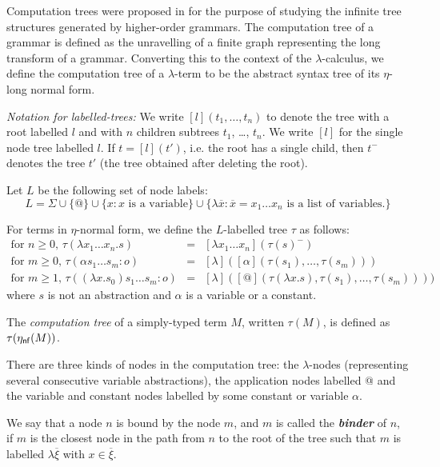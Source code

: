 \documentclass{llncs}
\newcommand\defname[1]{{\bf\em #1}\index{#1}}
\newcommand\etanf[1]{\eta_{\sf nf}(#1)}
\newcommand\union{\cup}
\begin{document}
Computation trees were proposed in \cite{OngHoMchecking2006} for the purpose of studying the infinite tree structures
generated by higher-order grammars. The computation tree of a grammar is defined as the unravelling of a finite graph representing the long transform of a grammar. Converting this to the context of the $\lambda$-calculus, we define the computation tree of a $\lambda$-term to be the abstract syntax tree of its $\eta$-long normal form.

\emph{Notation for labelled-trees:} We write $[l](t_1, \ldots, t_n)$ to denote the tree with a root labelled $l$ and with $n$ children subtrees $t_1$, \ldots, $t_n$. We write $[l]$ for the single node tree labelled $l$. If $t = [l](t')$, i.e. the root has a single child, then $t^-$ denotes the tree $t'$ (the tree obtained after deleting the root).

\begin{definition}
Let $L$ be the following set of node labels:
$$ L = \Sigma \union \{ @ \} \union \{ x : x \mbox { is a variable} \}
\union \{ \lambda \overline{x} : \overline{x} = x_1 \ldots x_n \mbox { is a list of variables.} \}
  $$

For terms in $\eta$-normal form, we define the $L$-labelled tree $\tau$ as follows:
\begin{eqnarray*}
  \mbox{for $n\geq0$, } \tau(\lambda x_1 \ldots x_n . s) &=& [\lambda x_1 \ldots x_n](\tau(s)^{-}) \\
  \mbox{for $m\geq0$, } \tau( \alpha s_1 \ldots s_m : o) &=& [ \lambda ]([\alpha](\tau(s_1),\ldots,\tau(s_m)))\\
  \mbox{for $m \geq 1$, } \tau((\lambda x.s_0) s_1 \ldots s_m :o) &=& [\lambda] ([@](\tau(\lambda x.s),\tau(s_1),\ldots,\tau(s_m))) )
\end{eqnarray*}
where $s$ is not an abstraction and $\alpha$ is a variable or a constant.

The \emph{computation tree} of a simply-typed term $M$, written $\tau(M)$, is defined as $\tau(\etanf{M})$.
\end{definition}

There are three kinds of nodes in the computation tree:
the $\lambda$-nodes (representing several consecutive variable abstractions),
the application nodes labelled @ and the variable and constant nodes labelled by some constant or variable $\alpha$.

We say that a node $n$ is bound by the node $m$, and $m$ is called the
\defname{binder} of $n$, if $m$ is the closest node in the path from $n$ to
the root of the tree such that $m$ is labelled $\lambda
\overline{\xi}$ with $x\in \overline{\xi}$.
\end{document}
